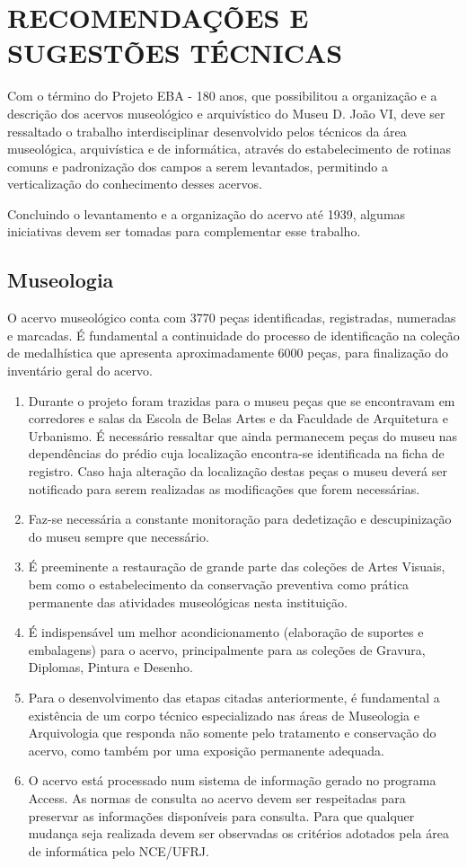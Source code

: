 \section{RECOMENDAÇÕES E SUGESTÕES TÉCNICAS}

Com o término do Projeto EBA - 180 anos, que possibilitou a organização e a descrição dos acervos museológico e arquivístico do Museu D. João VI, deve ser ressaltado o trabalho interdisciplinar desenvolvido pelos técnicos da área museológica, arquivística e de informática, através do estabelecimento de rotinas comuns e padronização dos campos a serem levantados, permitindo a verticalização do conhecimento desses acervos.

Concluindo o levantamento e a organização do acervo até 1939, algumas iniciativas devem ser tomadas para complementar esse trabalho.

\subsection{Museologia}

O acervo museológico conta com 3770 peças identificadas, registradas, numeradas e marcadas. É fundamental a continuidade do processo de identificação na coleção de medalhística que apresenta aproximadamente 6000 peças, para finalização do inventário geral do acervo.

\begin{enumerate}
	\item Durante o projeto foram trazidas para o museu peças que se encontravam em corredores e salas da Escola de Belas Artes e da Faculdade de Arquitetura e Urbanismo. É necessário ressaltar que ainda permanecem peças do museu nas dependências do prédio cuja localização encontra-se identificada na ficha de registro. Caso haja alteração da localização destas peças o museu deverá ser notificado para serem realizadas as modificações que forem necessárias.
	\item Faz-se necessária a constante monitoração para dedetização e descupinização do museu sempre que necessário.
	\item É preeminente a restauração de grande parte das coleções de Artes Visuais, bem como o estabelecimento da conservação preventiva como prática permanente das atividades museológicas nesta instituição.
	\item É indispensável um melhor acondicionamento (elaboração de suportes e embalagens) para o acervo, principalmente para as coleções de Gravura, Diplomas, Pintura e Desenho.
	\item Para o desenvolvimento das etapas citadas anteriormente, é fundamental a existência de um corpo técnico especializado nas áreas de Museologia e Arquivologia que responda não somente pelo tratamento e conservação do acervo, como também por uma exposição permanente adequada.
	\item O acervo está processado num sistema de informação gerado no programa Access. As normas de consulta ao acervo devem ser respeitadas para preservar as informações disponíveis para consulta. Para que qualquer mudança seja realizada devem ser observadas os critérios adotados pela área de informática pelo NCE/UFRJ.
\end{enumerate}

